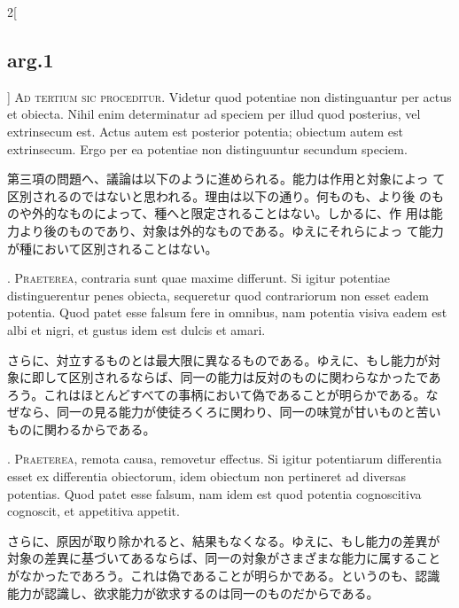 \documentclass[paper=a4paper,fontsize=10pt,jafontsize=9pt,titlepage]{jlreq}
\begin{document}
\begin{paracol}{2}[\subsection{arg.1}]
 {\scshape Ad tertium sic proceditur}. Videtur quod potentiae non
 distinguantur per actus et obiecta. Nihil enim determinatur ad
 speciem per illud quod posterius, vel extrinsecum est. Actus autem
 est posterior potentia; obiectum autem est extrinsecum. Ergo per ea
 potentiae non distinguuntur secundum speciem.
 
\switchcolumn

 第三項の問題へ、議論は以下のように進められる。能力は作用と対象によっ
 て区別されるのではないと思われる。理由は以下の通り。何ものも、より後
 のものや外的なものによって、種へと限定されることはない。しかるに、作
 用は能力より後のものであり、対象は外的なものである。ゆえにそれらによっ
 て能力が種において区別されることはない。

. {\scshape Praeterea}, contraria sunt quae maxime differunt. Si
igitur potentiae distinguerentur penes obiecta, sequeretur quod
contrariorum non esset eadem potentia. Quod patet esse falsum fere in
omnibus, nam potentia visiva eadem est albi et nigri, et gustus idem
est dulcis et amari.

 
\switchcolumn

さらに、対立するものとは最大限に異なるものである。ゆえに、もし能力が対
象に即して区別されるならば、同一の能力は反対のものに関わらなかったであ
ろう。これはほとんどすべての事柄において偽であることが明らかである。な
ぜなら、同一の見る能力が使徒ろくろに関わり、同一の味覚が甘いものと苦い
ものに関わるからである。

. {\scshape Praeterea}, remota causa, removetur effectus. Si igitur
potentiarum differentia esset ex differentia obiectorum, idem obiectum
non pertineret ad diversas potentias. Quod patet esse falsum, nam idem
est quod potentia cognoscitiva cognoscit, et appetitiva appetit.
 
 
\switchcolumn

さらに、原因が取り除かれると、結果もなくなる。ゆえに、もし能力の差異が
対象の差異に基づいてあるならば、同一の対象がさまざまな能力に属すること
がなかったであろう。これは偽であることが明らかである。というのも、認識
能力が認識し、欲求能力が欲求するのは同一のものだからである。



\end{paracol}
\end{document}
